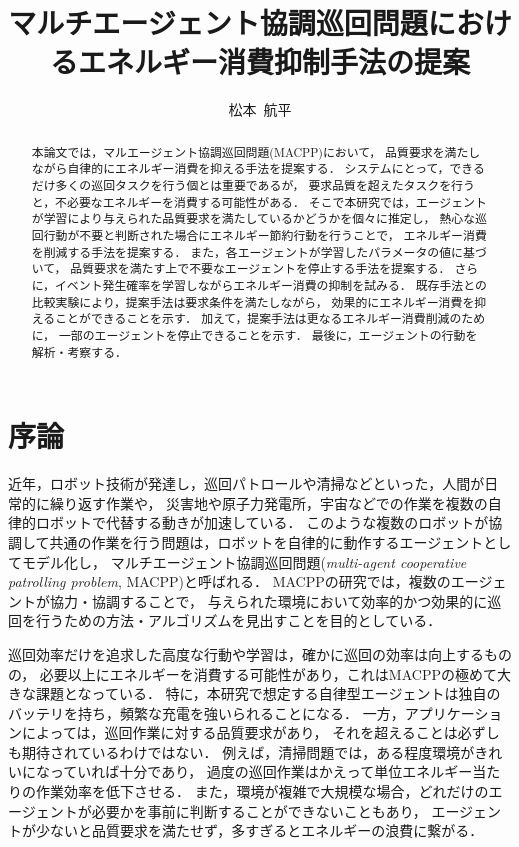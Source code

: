 \documentclass[12pt,a4j,twoside]{jarticle}
\title{マルチエージェント協調巡回問題におけるエネルギー消費抑制手法の提案}{5}
\author{松本~航平}
\begin{document}
\maketitle

\begin{abstract}
  本論文では，マルエージェント協調巡回問題(MACPP)において，
  品質要求を満たしながら自律的にエネルギー消費を抑える手法を提案する．
  システムにとって，できるだけ多くの巡回タスクを行う個とは重要であるが，
  要求品質を超えたタスクを行うと，不必要なエネルギーを消費する可能性がある．
  そこで本研究では，エージェントが学習により与えられた品質要求を満たしているかどうかを個々に推定し，
  熱心な巡回行動が不要と判断された場合にエネルギー節約行動を行うことで，
  エネルギー消費を削減する手法を提案する．
  また，各エージェントが学習したパラメータの値に基づいて，
  品質要求を満たす上で不要なエージェントを停止する手法を提案する．
  さらに，イベント発生確率を学習しながらエネルギー消費の抑制を試みる．
  既存手法との比較実験により，提案手法は要求条件を満たしながら，
  効果的にエネルギー消費を抑えることができることを示す．
  加えて，提案手法は更なるエネルギー消費削減のために，
  一部のエージェントを停止できることを示す．
  最後に，エージェントの行動を解析・考察する．
\end{abstract}

\vspace*{1cm}\par
\section{序論}\label{sec:introduction}
近年，ロボット技術が発達し，巡回パトロールや清掃などといった，人間が日常的に繰り返す作業や，
災害地や原子力発電所，宇宙などでの作業を複数の自律的ロボットで代替する動きが加速している．
このような複数のロボットが協調して共通の作業を行う問題は，ロボットを自律的に動作するエージェントとしてモデル化し，
マルチエージェント協調巡回問題({\em multi-agent cooperative patrolling problem}, MACPP)と呼ばれる．
MACPPの研究では，複数のエージェントが協力・協調することで，
与えられた環境において効率的かつ効果的に巡回を行うための方法・アルゴリズムを見出すことを目的としている．
\par

巡回効率だけを追求した高度な行動や学習は，確かに巡回の効率は向上するものの，
必要以上にエネルギーを消費する可能性があり，これはMACPPの極めて大きな課題となっている．
特に，本研究で想定する自律型エージェントは独自のバッテリを持ち，頻繁な充電を強いられることになる．
一方，アプリケーションによっては，巡回作業に対する品質要求があり，
それを超えることは必ずしも期待されているわけではない．
例えば，清掃問題では，ある程度環境がきれいになっていれば十分であり，
過度の巡回作業はかえって単位エネルギー当たりの作業効率を低下させる．
また，環境が複雑で大規模な場合，どれだけのエージェントが必要かを事前に判断することができないこともあり，
エージェントが少ないと品質要求を満たせず，多すぎるとエネルギーの浪費に繋がる．
\par
\end{document}
